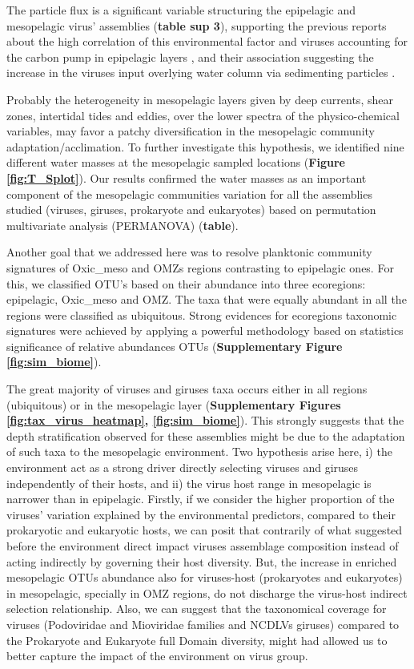 \documentclass[fleqn,10pt]{wlscirep}
\begin{document}
The particle flux is a significant variable structuring the epipelagic and mesopelagic virus’ assemblies (\textbf{table sup 3}), supporting the previous reports about the high correlation of this environmental factor and viruses accounting for the carbon pump in epipelagic layers \cite{guidi_plankton_2016}, and their association suggesting the increase in the viruses input overlying water column via sedimenting particles \cite{parada_viral_2007}.

Probably the heterogeneity in mesopelagic layers given by deep currents, shear zones, intertidal tides and eddies, over the lower spectra of the physico-chemical variables, may favor a patchy diversification in the mesopelagic community adaptation/acclimation. To further investigate this hypothesis, we identified nine different water masses at the mesopelagic sampled locations (\textbf{Figure \ref{fig:T_Splot}}). Our results confirmed the water masses as an important component of the mesopelagic communities variation for all the assemblies studied (viruses, giruses, prokaryote and eukaryotes) based on permutation multivariate analysis (PERMANOVA) (\textbf{table}).

Another goal that we addressed here was to resolve planktonic community signatures of Oxic\_meso and OMZs regions contrasting to epipelagic ones. For this, we classified OTU’s based on their abundance into three ecoregions: epipelagic, Oxic\_meso and OMZ. The taxa that were equally abundant in all the regions were classified as ubiquitous. Strong evidences for ecoregions taxonomic signatures were achieved by applying a powerful methodology based on statistics significance of relative abundances OTUs (\textbf{Supplementary Figure \ref{fig:sim_biome}}).

The great majority of viruses and giruses taxa occurs either in all regions (ubiquitous) or in the mesopelagic layer (\textbf{Supplementary Figures \ref{fig:tax_virus_heatmap}, \ref{fig:sim_biome}}). This strongly suggests that the depth stratification observed for these assemblies might be due to the adaptation of such taxa to the mesopelagic environment. Two hypothesis arise here, i) the environment act as a strong driver directly selecting viruses and giruses independently of their hosts, and ii) the virus host range in mesopelagic is narrower than in epipelagic. Firstly, if we consider the higher proportion of the viruses’ variation explained by the environmental predictors, compared to their prokaryotic and eukaryotic hosts, we can posit that contrarily of what suggested before the environment direct impact viruses assemblage composition instead of acting indirectly by governing their host diversity. But, the increase in enriched mesopelagic OTUs abundance also for viruses-host (prokaryotes and eukaryotes) in mesopelagic, specially in OMZ regions, do not discharge the virus-host indirect selection relationship. Also, we can suggest that the taxonomical coverage for viruses (Podoviridae and Mioviridae families and NCDLVs giruses) compared to the Prokaryote and Eukaryote full Domain diversity, might had allowed us to better capture the impact of the environment on virus group.
\end{document}

